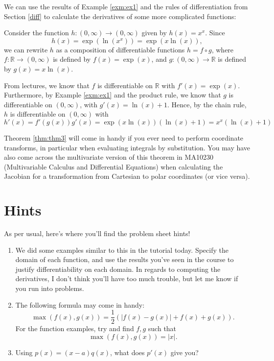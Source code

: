 \documentclass[
  10pt,
  a4paper]{article}
\providecommand{\tightlist}{%
  \setlength{\itemsep}{0pt}\setlength{\parskip}{0pt}}
\theoremstyle{plain}
\theoremstyle{definition}
\theoremstyle{plain}
\theoremstyle{plain}
\theoremstyle{plain}
\theoremstyle{plain}
\theoremstyle{definition}
\theoremstyle{definition}
\theoremstyle{remark}
\theoremstyle{remark}
\let\BeginKnitrBlock\begin \let\EndKnitrBlock\end
\begin{document}
We can use the results of Example \ref{exm:ex1} and the rules of differentiation from Section \ref{diff} to calculate the derivatives of some more complicated functions:
\BeginKnitrBlock{example}
{\label{exm:ex2} }Consider the function \(h:(0,\infty) \to (0,\infty)\) given by \(h(x) = x^x.\) Since \[h(x) = \exp(\ln(x^x)) = \exp(x\ln(x)),\] we can rewrite \(h\) as a composition of differentiable functions \(h = f \circ g\), where \(f:\mathbb{R} \to (0,\infty)\) is defined by \(f(x) = \exp(x)\), and \(g: (0,\infty) \to \mathbb{R}\) is defined by \(g(x) = x\ln(x).\)

From lectures, we know that \(f\) is differentiable on \(\mathbb{R}\) with \(f'(x) = \exp(x).\) Furthermore, by Example \ref{exm:ex1} and the product rule, we know that \(g\) is differentiable on \((0,\infty)\), with \(g'(x) = \ln(x) + 1.\) Hence, by the chain rule, \(h\) is differentiable on \((0,\infty)\) with \[h'(x) = f'(g(x))g'(x) = \exp(x\ln(x))\left(\ln(x) + 1\right) = x^x\left(\ln(x) + 1\right)\]
\EndKnitrBlock{example}

Theorem \ref{thm:thm3} will come in handy if you ever need to perform coordinate transforms, in particular when evaluating integrals by substitution. You may have also come across the multivariate version of this theorem in MA10230 (Multivariable Calculus and Differential Equations) when calculating the Jacobian for a transformation from Cartesian to polar coordinates (or vice versa).

\hypertarget{hints}{%
\section{Hints}\label{hints}}

As per usual, here's where you'll find the problem sheet hints!

\begin{enumerate}
\def\labelenumi{\arabic{enumi})}
\tightlist
\item
  We did some examples similar to this in the tutorial today. Specify the domain of each function, and use the results you've seen in the course to justify differentiability on each domain. In regards to computing the derivatives, I don't think you'll have too much trouble, but let me know if you run into problems.
\item
  The following formula may come in handy:\[\max(f(x),g(x)) = \frac{1}{2}\left(\lvert f(x) - g(x) \rvert + f(x) + g(x)\right).\]
  For the function examples, try and find \(f,g\) such that \[\max(f(x),g(x)) = \lvert x \rvert.\]
\item
  Using \(p(x) = (x-a)q(x)\), what does \(p'(x)\) give you?
\end{enumerate}
\end{document}
